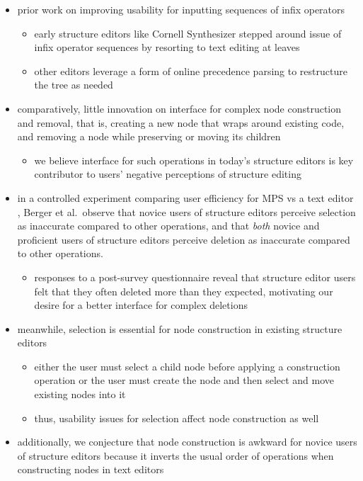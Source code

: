 \documentclass[runningheads]{llncs}
\begin{document}
\begin{itemize}
	\item prior work on improving usability for inputting sequences of infix operators
  	\begin{itemize}
  		\item early structure editors like Cornell Synthesizer \cite{cornell} stepped around issue of infix operator sequences by resorting to text editing at leaves
  		\item other editors leverage a form of online precedence parsing to restructure the tree as needed
  	\end{itemize}
	\item comparatively, little innovation on interface for complex node construction and removal, that is, creating a new node that wraps around existing code, and removing a node while preserving or moving its children
		\begin{itemize}
			\item we believe interface for such operations in today's structure editors is key contributor to users' negative perceptions of structure editing
		\end{itemize}
	\item in a controlled experiment comparing user efficiency for MPS vs a text editor \cite{efficiency_of_projectional_editing}, Berger et al.~observe that novice users of structure editors perceive selection as inaccurate compared to other operations, and that \emph{both} novice and proficient users of structure editors perceive deletion as inaccurate compared to other operations.
		\begin{itemize}
			\item responses to a post-survey questionnaire reveal that structure editor users felt that they often deleted more than they expected, motivating our desire for a better interface for complex deletions
		\end{itemize}
	\item meanwhile, selection is essential for node construction in existing structure editors
		\begin{itemize}
			\item either the user must select a child node before applying a construction operation or the user must create the node and then select and move existing nodes into it
			\item thus, usability issues for selection affect node construction as well
		\end{itemize}
	\item additionally, we conjecture that node construction is awkward for novice users of structure editors because it inverts the usual order of operations when constructing nodes in text editors
\end{itemize}
\end{document}
